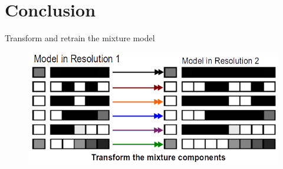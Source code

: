 \documentclass[utf8, a4paper]{beamer}
\begin{document}


\section
  {Conclusion}

\begin{bibunit}[plain]
\begin{frame}
  {Transform and retrain the mixture model}
\vspace{-1cm}
\begin{figure}
\centering
  \includegraphics[trim={0cm 0cm 0cm 0cm},clip, width=\textwidth]{images/idasecondpage}
\end{figure}


\end{frame}
\end{bibunit}



\end{document}
